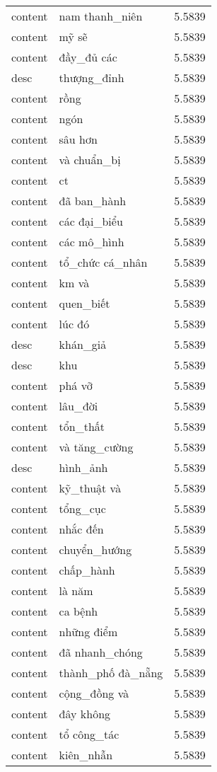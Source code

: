 \documentclass{article}
\begin{document}
\begin{tabular}{lll}
content & nam thanh\_niên & 5.5839\\
content & mỹ sẽ & 5.5839\\
content & đầy\_đủ các & 5.5839\\
desc & thượng\_đỉnh & 5.5839\\
content & rồng & 5.5839\\
content & ngón & 5.5839\\
content & sâu hơn & 5.5839\\
content & và chuẩn\_bị & 5.5839\\
content & ct & 5.5839\\
content & đã ban\_hành & 5.5839\\
content & các đại\_biểu & 5.5839\\
content & các mô\_hình & 5.5839\\
content & tổ\_chức cá\_nhân & 5.5839\\
content & km và & 5.5839\\
content & quen\_biết & 5.5839\\
content & lúc đó & 5.5839\\
desc & khán\_giả & 5.5839\\
desc & khu & 5.5839\\
content & phá vỡ & 5.5839\\
content & lâu\_đời & 5.5839\\
content & tổn\_thất & 5.5839\\
content & và tăng\_cường & 5.5839\\
desc & hình\_ảnh & 5.5839\\
content & kỹ\_thuật và & 5.5839\\
content & tổng\_cục & 5.5839\\
content & nhắc đến & 5.5839\\
content & chuyển\_hướng & 5.5839\\
content & chấp\_hành & 5.5839\\
content & là năm & 5.5839\\
content & ca bệnh & 5.5839\\
content & những điểm & 5.5839\\
content & đã nhanh\_chóng & 5.5839\\
content & thành\_phố đà\_nẵng & 5.5839\\
content & cộng\_đồng và & 5.5839\\
content & đây không & 5.5839\\
content & tổ công\_tác & 5.5839\\
content & kiên\_nhẫn & 5.5839\\

\end{tabular}
\end{document}
